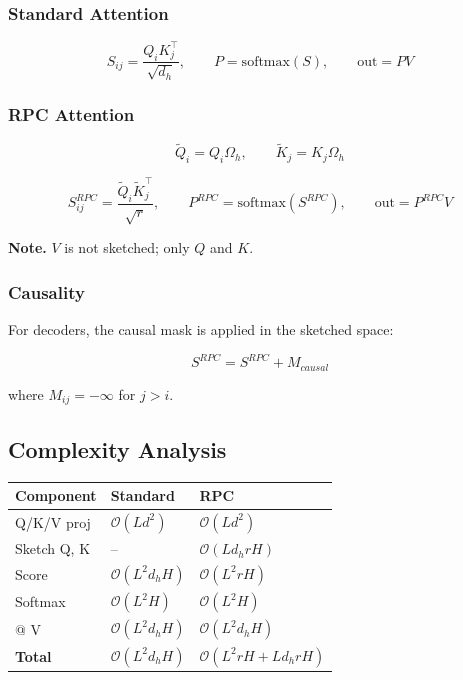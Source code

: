 \subsubsection{Standard Attention}

\[
S_{ij} = \frac{Q_i K_j^\top}{\sqrt{d_h}}, \qquad
P = \text{softmax}(S), \qquad
\text{out} = P V
\tag{4.2}
\]

\subsubsection{RPC Attention}

\[
\tilde{Q}_i = Q_i \Omega_h, \qquad
\tilde{K}_j = K_j \Omega_h
\tag{4.3}
\]

\[
S_{ij}^{RPC} = \frac{\tilde{Q}_i \tilde{K}_j^\top}{\sqrt{r}}, \qquad
P^{RPC} = \text{softmax}(S^{RPC}), \qquad
\text{out} = P^{RPC} V
\tag{4.4}
\]

\textbf{Note.} $V$ is not sketched; only $Q$ and $K$.

\subsubsection{Causality}

For decoders, the causal mask is applied in the sketched space:

\[
S^{RPC} = S^{RPC} + M_{causal}
\tag{4.5}
\]

where $M_{ij} = -\infty$ for $j > i$.

\subsection{Complexity Analysis}

\begin{table}[H]
\centering
\small
\begin{tabular}{lll}
\toprule
\textbf{Component} & \textbf{Standard} & \textbf{RPC} \\
\midrule
Q/K/V proj & $\mathcal{O}(L d^2)$ & $\mathcal{O}(L d^2)$ \\
Sketch Q, K & -- & $\mathcal{O}(L d_h r H)$ \\
Score & $\mathcal{O}(L^2 d_h H)$ & $\mathcal{O}(L^2 r H)$ \\
Softmax & $\mathcal{O}(L^2 H)$ & $\mathcal{O}(L^2 H)$ \\
@ V & $\mathcal{O}(L^2 d_h H)$ & $\mathcal{O}(L^2 d_h H)$ \\
\textbf{Total} & $\mathcal{O}(L^2 d_h H)$ & $\mathcal{O}(L^2 r H + L d_h r H)$ \\
\bottomrule
\end{tabular}
\end{table}

